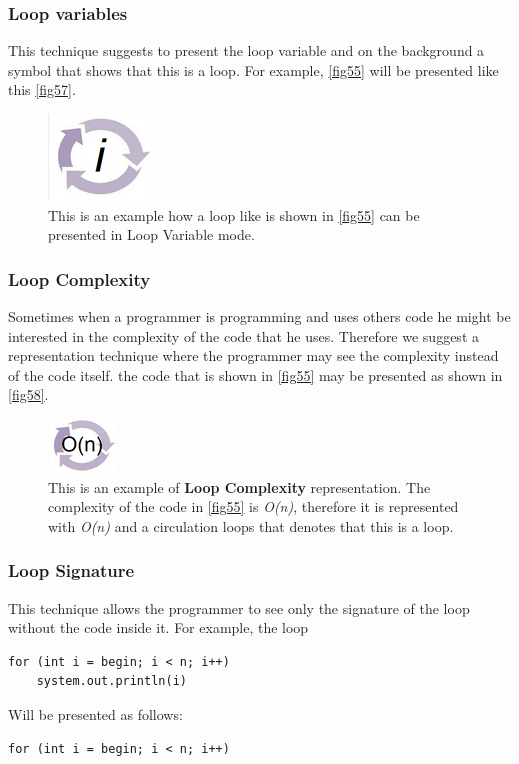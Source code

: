 \subsubsection{Loop variables}
This technique suggests to present the loop variable and on the background a symbol that shows that this is a loop. For example, \autoref{fig55} will be presented like this \autoref{fig57}.
\begin{figure}[H]
	\includegraphics{"./fig/Loop Variable"}
	\caption{This is an example how a loop like is shown in \autoref{fig55} can be presented in Loop Variable mode.}
	\label{fig57}
\end{figure}
\subsubsection{Loop Complexity}
Sometimes when a programmer is programming and uses others code he might be interested in the complexity of the code that he uses. Therefore we suggest a representation technique where the programmer may see the complexity instead of the code itself. the code that is shown in \autoref{fig55} may be presented as shown in \autoref{fig58}.
\begin{figure}[H]
	\includegraphics{"./fig/Code Complexity Representation"}
	\caption{This is an example of \textbf{Loop Complexity} representation. The complexity of the code in \autoref{fig55} is \textit{O(n)}, therefore it is represented with \textit{O(n)} and a circulation loops that denotes that this is a loop.}
	\label{fig58}
\end{figure}
\subsubsection{Loop Signature}
This technique allows the programmer to see only the signature of the loop without the code inside it. For example, the loop 
\begin{lstlisting}
for (int i = begin; i < n; i++)
	system.out.println(i)
\end{lstlisting}
Will be presented as follows:
\begin{lstlisting}
for (int i = begin; i < n; i++)
\end{lstlisting}
